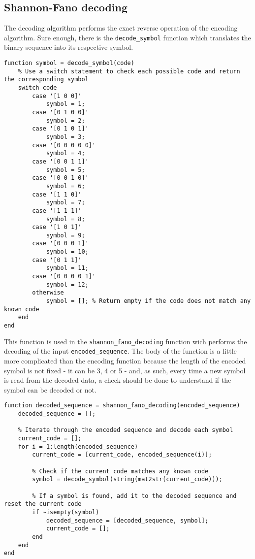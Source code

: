 \subsection{Shannon-Fano decoding}\label{source-decoding}
The decoding algorithm performs the exact reverse operation of the encoding algorithm. Sure enough, there is the \texttt{decode\_symbol} function which translates the binary sequence into its respective symbol.
\begin{lstlisting}
function symbol = decode_symbol(code)
    % Use a switch statement to check each possible code and return the corresponding symbol
    switch code
        case '[1 0 0]'
            symbol = 1;
        case '[0 1 0 0]'
            symbol = 2;
        case '[0 1 0 1]'
            symbol = 3;
        case '[0 0 0 0 0]'
            symbol = 4;
        case '[0 0 1 1]'
            symbol = 5;
        case '[0 0 1 0]'
            symbol = 6;
        case '[1 1 0]'
            symbol = 7;
        case '[1 1 1]'
            symbol = 8;
        case '[1 0 1]'
            symbol = 9;
        case '[0 0 0 1]'
            symbol = 10;
        case '[0 1 1]'
            symbol = 11;
        case '[0 0 0 0 1]'
            symbol = 12;
        otherwise
            symbol = []; % Return empty if the code does not match any known code
    end
end
\end{lstlisting}

\noindent This function is used in the \texttt{shannon\_fano\_decoding} function wich performs the decoding of the input \texttt{encoded\_sequence}. The body of the function is a little more complicated than the encoding function because the length of the encoded symbol is not fixed - it can be 3, 4 or 5 - and, as such, every time a new symbol is read from the decoded data, a check should be done to understand if the symbol can be decoded or not. 

\begin{lstlisting}
function decoded_sequence = shannon_fano_decoding(encoded_sequence)
    decoded_sequence = [];
    
    % Iterate through the encoded sequence and decode each symbol
    current_code = [];
    for i = 1:length(encoded_sequence)
        current_code = [current_code, encoded_sequence(i)];
        
        % Check if the current code matches any known code
        symbol = decode_symbol(string(mat2str(current_code)));
        
        % If a symbol is found, add it to the decoded sequence and reset the current code
        if ~isempty(symbol)
            decoded_sequence = [decoded_sequence, symbol];
            current_code = [];
        end
    end
end
\end{lstlisting}
